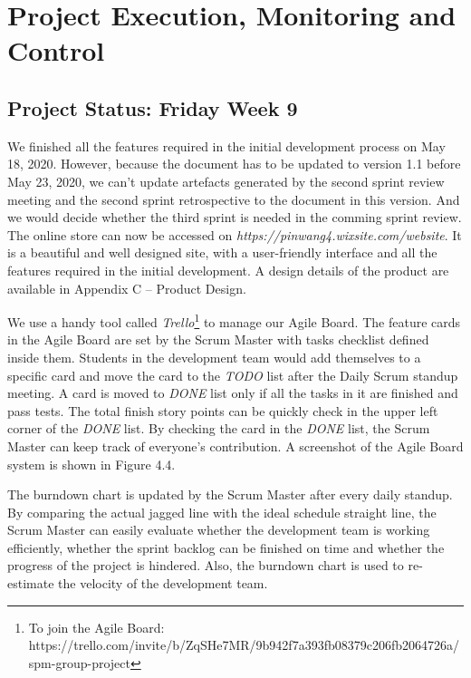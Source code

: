 \chapter{Project Execution, Monitoring and Control}
\label{chap:pe}
\section{Project Status: Friday Week 9}
\label{sec:ps1}
We finished all the features required in the initial development process on May 18, 2020. However, because the document has to be updated to version 1.1 before May 23, 2020, we can’t update artefacts generated by the second sprint review meeting and the second sprint retrospective to the document in this version. And we would decide whether the third sprint is needed in the comming sprint review. The online store can now be accessed on \textit{https://pinwang4.wixsite.com/website}. It is a beautiful and well designed site, with a user-friendly interface and all the features required in the initial development. A design details of the product are available in Appendix C -- Product Design.

We use a handy tool called \textit{Trello}\footnote{To join the Agile Board: https://trello.com/invite/b/ZqSHe7MR/9b942f7a393fb08379c206fb2064726a/spm-group-project} to manage our Agile Board. The feature cards in the Agile Board are set by the Scrum Master with tasks checklist defined inside them. Students in the development team would add themselves to a specific card and move the card to the \textit{TODO} list after the Daily Scrum standup meeting. A card is moved to \textit{DONE} list only if all the tasks in it are finished and pass tests. The total finish story points can be quickly check in the upper left corner of the \textit{DONE} list. By checking the card in the \textit{DONE} list, the Scrum Master can keep track of everyone’s contribution. A screenshot of the Agile Board system is shown in Figure 4.4.

The burndown chart is updated by the Scrum Master after every daily standup. By comparing the actual jagged line with the ideal schedule straight line, the Scrum Master can easily evaluate whether the development team is working efficiently, whether the sprint backlog can be finished on time and whether the progress of the project is hindered. Also, the burndown chart is used to re-estimate the velocity of the development team. 

